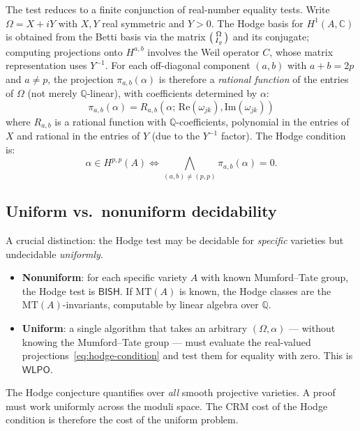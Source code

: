\documentclass[11pt]{article}
\theoremstyle{plain}
\theoremstyle{definition}
\theoremstyle{remark}
\newcommand{\Q}{\mathbb{Q}}
\newcommand{\C}{\mathbb{C}}
\newcommand{\MT}{\mathrm{MT}}
\newcommand{\BISH}{\ensuremath{\mathsf{BISH}}}
\newcommand{\WLPO}{\ensuremath{\mathsf{WLPO}}}
\begin{document}
The test reduces to a finite conjunction of real-number equality tests. Write $\Omega = X + iY$ with $X, Y$ real symmetric and $Y > 0$. The Hodge basis for $H^1(A, \C)$ is obtained from the Betti basis via the matrix $\begin{psmallmatrix} \Omega \\ I_g \end{psmallmatrix}$ and its conjugate; computing projections onto $H^{a,b}$ involves the Weil operator $C$, whose matrix representation uses $Y^{-1}$. For each off-diagonal component $(a,b)$ with $a + b = 2p$ and $a \neq p$, the projection $\pi_{a,b}(\alpha)$ is therefore a \emph{rational function} of the entries of $\Omega$ (not merely $\Q$-linear), with coefficients determined by $\alpha$:
\[
\pi_{a,b}(\alpha) = R_{a,b}(\alpha; \, \mathrm{Re}(\omega_{jk}), \mathrm{Im}(\omega_{jk}))
\]
where $R_{a,b}$ is a rational function with $\Q$-coefficients, polynomial in the entries of $X$ and rational in the entries of $Y$ (due to the $Y^{-1}$ factor). The Hodge condition is:
\begin{equation}\label{eq:hodge-condition}
\alpha \in H^{p,p}(A) \iff \bigwedge_{(a,b) \neq (p,p)} \pi_{a,b}(\alpha) = 0.
\end{equation}

\subsection{Uniform vs.\ nonuniform decidability}

A crucial distinction: the Hodge test may be decidable for \emph{specific} varieties but undecidable \emph{uniformly}.

\begin{itemize}
\item \textbf{Nonuniform}: for each specific variety $A$ with known Mumford--Tate group, the Hodge test is $\BISH$. If $\MT(A)$ is known, the Hodge classes are the $\MT(A)$-invariants, computable by linear algebra over $\Q$.
\item \textbf{Uniform}: a single algorithm that takes an arbitrary $(\Omega, \alpha)$ --- without knowing the Mumford--Tate group --- must evaluate the real-valued projections~\eqref{eq:hodge-condition} and test them for equality with zero. This is $\WLPO$.
\end{itemize}

The Hodge conjecture quantifies over \emph{all} smooth projective varieties. A proof must work uniformly across the moduli space. The CRM cost of the Hodge condition is therefore the cost of the uniform problem.
\end{document}
